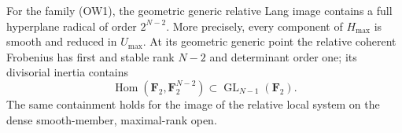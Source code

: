 \begin{theorem}
\label{thm:odd-cover-full-hyperplane-inertia}
For the family (OW1), the geometric generic relative Lang image
contains a full hyperplane radical of order \(2^{N-2}\).
More precisely, every component of \(H_{\max}\) is smooth and
reduced in \(U_{\max}\).  At its geometric generic point the
relative coherent Frobenius has first and stable rank \(N-2\)
and determinant order one; its divisorial inertia contains
\[
 \operatorname{Hom}(\mathbf F_2,\mathbf F_2^{N-2})
 \subset\operatorname{GL}_{N-1}(\mathbf F_2).
 \tag{OW11}
\]
The same containment holds for the image of the relative local system
on the dense smooth-member, maximal-rank open.
\end{theorem}
